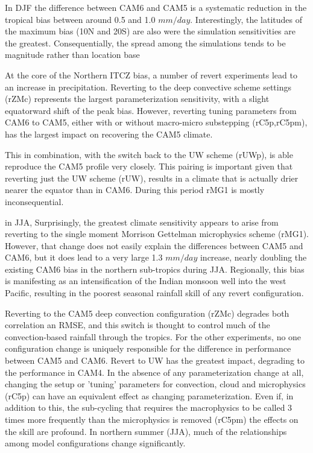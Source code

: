 In DJF the difference between CAM6 and CAM5 is a systematic reduction in the tropical bias between around 0.5 and 1.0 $mm/day$. Interestingly, the latitudes of the maximum bias (10\deg N and 20\deg S) are also were the simulation sensitivities are the greatest. Consequentially, the spread among the simulations tends to be magnitude rather than location base


 At the core of the Northern ITCZ bias, a number of revert experiments lead to an increase in precipitation. Reverting to the deep convective scheme settings (rZMc) represents the largest parameterization sensitivity, with a slight equatorward shift of the peak bias. However, reverting tuning parameters from CAM6 to CAM5, either with or without macro-micro substepping (rC5p,rC5pm), has the largest impact on recovering the CAM5 climate. 
 
 This in combination, with the switch back to the UW scheme (rUWp), is able reproduce the CAM5 profile very closely. This pairing is important given that reverting just the UW scheme (rUW), results in a climate that is actually drier nearer the equator than in CAM6. During this period rMG1 is mostly inconsequential.
 
 
in JJA, Surprisingly, the greatest climate sensitivity appears to arise from reverting to the single moment Morrison Gettelman microphysics scheme (rMG1). However, that change does not easily explain the differences between CAM5 and CAM6, but it does lead to a very large 1.3 $mm/day$ increase, nearly doubling the existing CAM6 bias in the northern sub-tropics during JJA. Regionally, this bias is manifesting as an intensification of the Indian monsoon well into the west Pacific, resulting in the poorest seasonal rainfall skill of any revert configuration. 

Reverting to the CAM5 deep convection configuration (rZMc) degrades both correlation an RMSE, and this switch is thought to control much of the convection-based rainfall through the tropics. For the other experiments, no one configuration change is uniquely responsible for the difference in performance between CAM5 and CAM6. Revert to UW has the greatest impact, degrading to the performance in CAM4. In the absence of any parameterization change at all, changing the setup or 'tuning' parameters for convection, cloud and  microphysics (rC5p) can have an equivalent effect as changing parameterization. Even if, in addition to this, the sub-cycling that  requires the macrophysics to be called 3 times more frequently than the microphysics is removed (rC5pm) the effects on the skill are profound. In northern summer (JJA), much of the relationships among model configurations change significantly. 

